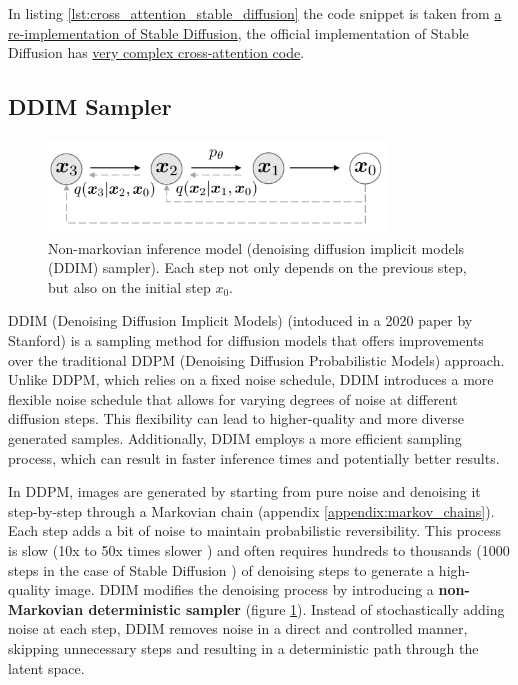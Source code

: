 In listing \ref{lst:cross_attention_stable_diffusion} the code snippet is taken from \href{https://github.com/hkproj/pytorch-stable-diffusion/blob/e0cb06de011787cdf13eed7b4287ad8410491149/sd/attention.py#L100C1-L110C28}{a re-implementation of Stable Diffusion}, the official implementation of Stable Diffusion has \href{https://github.com/CompVis/stable-diffusion/blob/21f890f9da3cfbeaba8e2ac3c425ee9e998d5229/ldm/modules/attention.py#L152}{very complex cross-attention code}.











\subsection{DDIM Sampler}

\begin{figure}
    \centering
    \includegraphics[width=0.8\textwidth]{images/diffusion_models/stable_diffusion/ddim_non_markov_process.png}
    \caption{Non-markovian inference model \cite{ddim} (denoising diffusion implicit models (DDIM) sampler). Each step not only depends on the previous step, but also on the initial step $x_0$.}
    \label{fig:ddim_non_markov_process}
\end{figure}

DDIM (Denoising Diffusion Implicit Models) (intoduced in a 2020 paper by Stanford) \cite{ddim} is a sampling method for diffusion models that offers improvements over the traditional DDPM (Denoising Diffusion Probabilistic Models) \cite{ddpm} approach. Unlike DDPM, which relies on a fixed noise schedule, DDIM introduces a more flexible noise schedule that allows for varying degrees of noise at different diffusion steps. This flexibility can lead to higher-quality and more diverse generated samples. Additionally, DDIM employs a more efficient sampling process, which can result in faster inference times and potentially better results.

In DDPM, images are generated by starting from pure noise and denoising it step-by-step through a Markovian chain (appendix \ref{appendix:markov_chains}). Each step adds a bit of noise to maintain probabilistic reversibility. This process is slow (10x to 50x times slower \cite{ddim}) and often requires hundreds to thousands (1000 steps in the case of Stable Diffusion \cite{stable_diffusion}) of denoising steps to generate a high-quality image. DDIM modifies the denoising process by introducing a \textbf{non-Markovian deterministic sampler} (figure \ref{fig:ddim_non_markov_process}). Instead of stochastically adding noise at each step, DDIM removes noise in a direct and controlled manner, skipping unnecessary steps and resulting in a deterministic path through the latent space.

